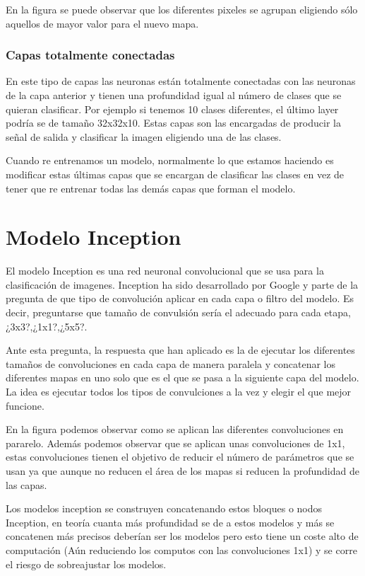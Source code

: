 En la figura se puede observar que los diferentes pixeles se agrupan eligiendo sólo aquellos de mayor valor para el nuevo mapa.

\subsubsection{Capas totalmente conectadas}

En este tipo de capas las neuronas están totalmente conectadas con las neuronas de la capa anterior y tienen una profundidad igual al número de clases que se quieran clasificar. Por ejemplo si tenemos 10 clases diferentes, el último layer podría se de tamaño 32x32x10. Estas capas son las encargadas de producir la señal de salida y clasificar la imagen eligiendo una de las clases. 

Cuando re entrenamos un modelo, normalmente lo que estamos haciendo es modificar estas últimas capas que se encargan de clasificar las clases en vez de tener que re entrenar todas las demás capas que forman el modelo.

\section{Modelo Inception}

El modelo Inception es una red neuronal convolucional que se usa para la clasificación de imagenes. Inception ha sido desarrollado por Google y parte de la pregunta de que tipo de convolución aplicar en cada capa o  filtro del modelo. Es decir, preguntarse que tamaño de convulsión sería el adecuado para cada etapa, ¿3x3?,¿1x1?,¿5x5?.

Ante esta pregunta, la respuesta que han aplicado es la de ejecutar los diferentes tamaños de convoluciones en cada capa de manera paralela y concatenar los diferentes mapas en uno solo que es el que se pasa a la siguiente capa del modelo. La idea es ejecutar todos los tipos de convulciones a la vez y elegir el que mejor funcione.


En la figura podemos observar como se aplican las diferentes convoluciones en pararelo. Además podemos observar que se aplican unas convoluciones de 1x1, estas convoluciones tienen el objetivo de reducir el número de parámetros que se usan ya que aunque no reducen el área de los mapas si reducen la profundidad de las capas.

Los modelos inception se construyen concatenando estos bloques o nodos Inception, en teoría cuanta más profundidad se de a estos modelos y más se concatenen más precisos deberían ser los modelos pero esto tiene un coste alto de computación (Aún reduciendo los computos con las convoluciones 1x1) y se corre el riesgo de sobreajustar los modelos.

